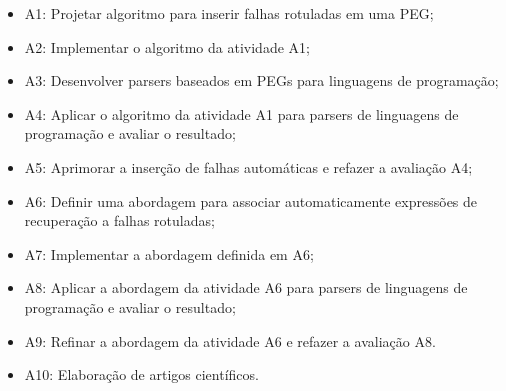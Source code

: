 \documentclass[titlepage,12pt]{article}
\begin{document}
\begin{itemize}
	\item A1: Projetar algoritmo para inserir falhas rotuladas em uma PEG;
	\item A2: Implementar o algoritmo da atividade A1;
	\item A3: Desenvolver parsers baseados em PEGs para linguagens de programação;
	\item A4: Aplicar o algoritmo da atividade A1 para parsers de linguagens de programação
  e avaliar o resultado;
	\item A5: Aprimorar a inserção de falhas automáticas e refazer a avaliação A4;
	\item A6: Definir uma abordagem para associar automaticamente expressões
  de recuperação a falhas rotuladas;
  \item A7: Implementar a abordagem definida em A6;
	\item A8: Aplicar a abordagem da atividade A6 para parsers de linguagens
  de programação e avaliar o resultado;  
	\item A9: Refinar a abordagem da atividade A6 e refazer a avaliação A8.
	\item A10: Elaboração de artigos científicos.
\end{itemize}

\begin{comment}
\begin{table}[h]
\centering
\begin{tabular}{|l|c|c|c|c|c|c|} \hline
\diagbox{Atividade}{Semestre}     &  1  &  2  &  3  &  4  &  5  &  6   \\ \hline
                    A1            &  X  &  X  &     &     &     &      \\ \hline
                    A2            &  X  &  X  &     &     &     &      \\ \hline
                    A3            &  X  &  X  &  X  &     &     &      \\ \hline
                    A4            &     &  X  &  X  &     &     &      \\ \hline 
                    A5            &     &     &     &  X  &  X  &      \\ \hline
                    A6            &     &     &  X  &  X  &     &      \\ \hline
                    A7            &     &     &  X  &  X  &     &      \\ \hline
                    A8            &     &     &  X  &  X  &     &      \\ \hline
                    A9            &     &     &     &     &  X  &  X   \\ \hline
                    A10           &     &  X  &  X  &  X  &  X  &  X   \\ \hline
\end{tabular}
\caption{Cronograma de Atividades}
\label{tab:cronograma}
\end{table}
\end{comment}
\end{document}
